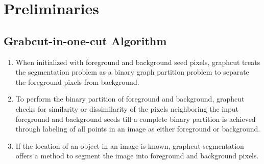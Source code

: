 \documentclass {udthesis}
\begin{document}
\section{Preliminaries}

\subsection{Grabcut-in-one-cut Algorithm}
\label{sec:onecut}

\begin{enumerate}
	\item When initialized with foreground and background seed pixels, graphcut treats the segmentation problem as a binary graph partition problem to separate the foreground pixels from background.
	
	\item To perform the binary partition of foreground and background, graphcut checks for similarity or dissimilarity of the pixels neighboring the input foreground and background seeds till a complete binary partition is achieved through labeling of all points in an image as either foreground or background.
	
	\item If the location of an object in an image is known, graphcut segmentation offers a method to segment the image into foreground and background pixels.
\end{enumerate}
\end{document}
